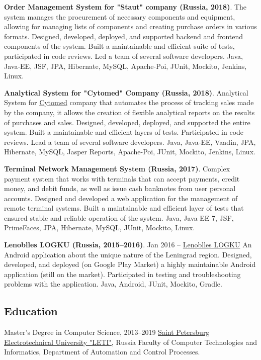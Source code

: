 \documentclass{vl}
\begin{document}
    \textbf{Order Management System for "Staut" company (Russia, 2018)}.
    The system manages the procurement of necessary components and equipment,
    allowing for managing lists of components and creating purchase orders in various formats.
    Designed, developed, deployed, and supported backend and frontend components of the system.
    Built a maintainable and efficient suite of tests, participated in code reviews.
    Led a team of several software developers.
    Java, Java‐EE, JSF, JPA, Hibernate, MySQL, Apache-Poi, JUnit, Mockito, Jenkins, Linux.

    \textbf{Analytical System for "Cytomed" Company (Russia, 2018)}.
    Analytical System for \href{https://cytomed.ru/en/}{Cytomed} company that automates the process of tracking sales
    made by the company, it allows the creation of flexible analytical reports on the results of purchases and sales.
    Designed, developed, deployed, and supported the entire system.
    Built a maintainable and efficient layers of tests.
    Participated in code reviews.
    Lead a team of several software developers.
    Java, Java‐EE, Vaadin, JPA, Hibernate, MySQL, Jasper Reports, Apache-Poi, JUnit, Mockito, Jenkins, Linux.

    \textbf{Terminal Network Management System (Russia, 2017)}.
    Complex payment system that works with terminals that can accept payments, credit money, and debit funds,
    as well as issue cash banknotes from user personal accounts.
    Designed and developed a web application for the management of remote terminal systems.
    Built a maintainable and efficient layer of tests that ensured stable and reliable operation of the system.
    Java, Java EE 7, JSF, PrimeFaces, JPA, Hibernate, MySQL, JUnit, Mockito, Linux.

    \textbf{Lenoblles LOGKU (Russia, 2015--2016)}.
    Jan 2016 – \href{https://play.google.com/store/apps/details?id=com.altinntech.oopt_lo}{Lenoblles LOGKU}
    An Android application about the unique nature of the Leningrad region.
    Designed, developed, and deployed (on Google Play Market) a highly maintainable Android application
    (still on the market).
    Participated in testing and troubleshooting problems with the application.
    Java, Android, JUnit, Mockito, Gradle.

    \subsection*{Education}
    \begin{samepage}
        Master's Degree in Computer Science, 2013--2019\newline
        \href{https://etu.ru/en/university/}{Saint Petersburg Electrotechnical University "LETI"}, Russia\newline
        Faculty of Computer Technologies and Informatics, Department of Automation and Control Processes.
    \end{samepage}
\end{document}
